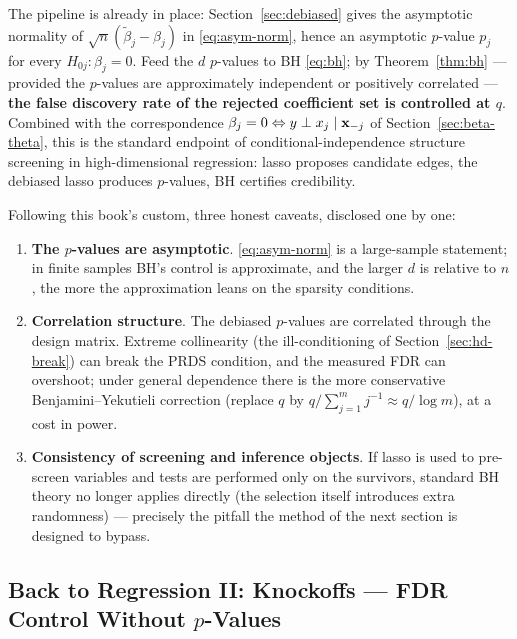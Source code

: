 The pipeline is already in place: Section~\ref{sec:debiased} gives the asymptotic normality of $\sqrt{n}(\widetilde{\beta}_j - \beta_j)$ in \eqref{eq:asym-norm}, hence an asymptotic $p$-value $p_j$ for every $H_{0j}: \beta_j = 0$. Feed the $d$ $p$-values to BH \eqref{eq:bh}; by Theorem~\ref{thm:bh} — provided the $p$-values are approximately independent or positively correlated — \textbf{the false discovery rate of the rejected coefficient set is controlled at $q$}. Combined with the correspondence $\beta_j = 0 \Leftrightarrow y \perp x_j \mid \mathbf{x}_{-j}$ of Section~\ref{sec:beta-theta}, this is the standard endpoint of conditional-independence structure screening in high-dimensional regression: lasso proposes candidate edges, the debiased lasso produces $p$-values, BH certifies credibility.

Following this book's custom, three honest caveats, disclosed one by one:
\begin{enumerate}[label=(\roman*)]
  \item \textbf{The $p$-values are asymptotic}. \eqref{eq:asym-norm} is a large-sample statement; in finite samples BH's control is approximate, and the larger $d$ is relative to $n$, the more the approximation leans on the sparsity conditions.
  \item \textbf{Correlation structure}. The debiased $p$-values are correlated through the design matrix. Extreme collinearity (the ill-conditioning of Section~\ref{sec:hd-break}) can break the PRDS condition, and the measured FDR can overshoot; under general dependence there is the more conservative Benjamini--Yekutieli correction\cite{benjamini2001} (replace $q$ by $q / \sum_{j=1}^m j^{-1} \approx q / \log m$), at a cost in power.
  \item \textbf{Consistency of screening and inference objects}. If lasso is used to pre-screen variables and tests are performed only on the survivors, standard BH theory no longer applies directly (the selection itself introduces extra randomness) — precisely the pitfall the method of the next section is designed to bypass.
\end{enumerate}

\subsection[Back to Regression II: Knockoffs]{Back to Regression II: Knockoffs — FDR Control Without $p$-Values}\label{sec:knockoffs}

